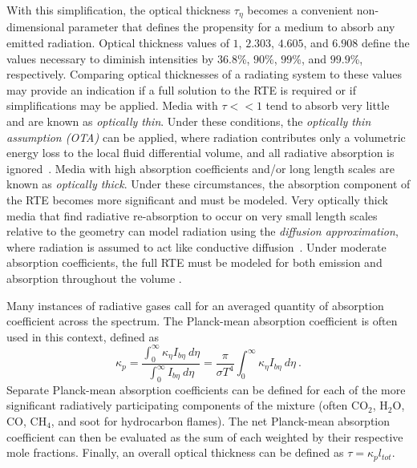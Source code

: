With this simplification, the optical thickness $\mathit{\tau{}_\eta{}}$ becomes a convenient non-dimensional parameter that defines the propensity for a medium to absorb any emitted radiation.
Optical thickness values of $1$, $2.303$, $4.605$, and $6.908$ define the values necessary to diminish intensities by $36.8$\%, $90$\%, $99$\%, and $99.9$\%, respectively.
Comparing optical thicknesses of a radiating system to these values may provide an indication if a full solution to the RTE is required or if simplifications may be applied.
Media with $\tau{}<<1$ tend to absorb very little and are known as \textit{optically thin}. Under these conditions, the \textit{optically thin assumption (OTA)} can be applied, where radiation contributes only a volumetric energy loss to the local fluid differential volume, and all radiative absorption is ignored~\cite{Modest2022ChapterMediab}.
Media with high absorption coefficients and/or long length scales are known as \textit{optically thick}. Under these circumstances, the absorption component of the RTE becomes more significant and must be modeled.
Very optically thick media that find radiative re-absorption to occur on very small length scales relative to the geometry can model radiation using the \textit{diffusion approximation}, where radiation is assumed to act like conductive diffusion~\cite{Modest2022ChapterMediab}. 
Under moderate absorption coefficients, the full RTE must be modeled for both emission and absorption throughout the volume \cite{Modest2013RadiativeTransfer}.

Many instances of radiative gases call for an averaged quantity of absorption coefficient across the spectrum. The Planck-mean absorption coefficient is often used in this context, defined as
\begin{equation}
    \kappa{}_p = \frac{\int^\infty_0{\kappa{}_\eta{}I_{b\eta}~d\eta}}{\int^\infty_0{I_{b\eta}~d\eta}}=\frac{\pi}{\sigma{}T^4}\int^\infty_0{\kappa{}_\eta{}I_{b\eta}~d\eta} \ .
    \label{eq:PlanckMean}
\end{equation}
Separate Planck-mean absorption coefficients can be defined for each of the more significant radiatively participating components of the mixture (often CO$_2$, H$_2$O, CO, CH$_4$, and soot for hydrocarbon flames). The net Planck-mean absorption coefficient can then be evaluated as the sum of each weighted by their respective mole fractions.
Finally, an overall optical thickness can be defined as $\tau{}=\kappa{}_pl_{tot}$.

